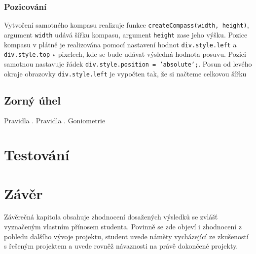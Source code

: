 \subsection{Pozicování}
Vytvoření samotného kompasu realizuje funkce \texttt{createCompass(width, height)}, argument \texttt{width} udává šířku kompasu, argument \texttt{height} zase jeho výšku. Pozice kompasu v plátně je realizována pomocí nastavení hodnot \texttt{div.style.left} a 
\texttt{div.style.top} v pixelech, kde se bude udávat výsledná hodnota posuvu. Pozici samotnou nastavuje řádek \texttt{div.style.position = 'absolute';}. Posun  od levého okraje obrazovky \texttt{div.style.left} je vypočten tak, že si načteme celkovou šířku

\newpage

\section{Zorný úhel}


Pravidla \cite{Kompendium}. Pravidla \cite{Goniometrie}. 
Goniometrie
\chapter{Testování}
\label{chapter:5}


\chapter{Závěr}
\label{chapter:6}

Závěrečná kapitola obsahuje zhodnocení dosažených výsledků se zvlášť vyznačeným vlastním přínosem studenta. Povinně se zde objeví i zhodnocení z pohledu dalšího vývoje projektu, student uvede náměty vycházející ze zkušeností s řešeným projektem a uvede rovněž návaznosti na právě dokončené projekty.

